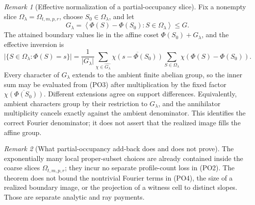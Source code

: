 \documentclass[12pt,a4paper]{amsart}
\numberwithin{equation}{section}
\theoremstyle{remark}
\newtheorem{remark}[remark]{Remark}
\newcommand{\abs}[1]{\lvert #1\rvert}
\begin{document}
\begin{remark}[Effective normalization of a partial-occupancy slice]
Fix a nonempty slice \(\Omega_\lambda=\Omega_{t,m,p,r}\), choose
\(S_0\in\Omega_\lambda\), and let
\[
 G_\lambda=
 \left\langle\Phi(S)-\Phi(S_0):S\in\Omega_\lambda\right\rangle
 \le G.
\]
The attained boundary values lie in the affine coset
\(\Phi(S_0)+G_\lambda\), and the effective inversion is
\[
 \abs{\{S\in\Omega_\lambda:\Phi(S)=s\}}
 =\frac1{\abs{G_\lambda}}
   \sum_{\chi\in\widehat{G_\lambda}}
   \overline{\chi(s-\Phi(S_0))}
   \sum_{S\in\Omega_\lambda}
      \chi(\Phi(S)-\Phi(S_0)).                       \tag{PO5}
\]
Every character of \(G_\lambda\) extends to the ambient finite abelian
group, so the inner sum may be evaluated from \textup{(PO3)} after
multiplication by the fixed factor
\(\overline{\chi(\Phi(S_0))}\).  Different extensions agree on support
differences.  Equivalently, ambient characters group by their restriction
to \(G_\lambda\), and the annihilator multiplicity cancels exactly against
the ambient denominator.  This identifies the correct Fourier denominator;
it does not assert that the realized image fills the affine group.
\end{remark}

\begin{remark}[What partial-occupancy add-back does and does not prove]
The exponentially many local proper-subset choices are already contained
inside the coarse slices \(\Omega_{t,m,p,r}\); they incur no separate
profile-count loss in \textup{(PO2)}.  The theorem does not bound the
nontrivial Fourier terms in \textup{(PO4)}, the size of a realized
boundary image, or the projection of a witness cell to distinct slopes.
Those are separate analytic and ray payments.
\end{remark}
\end{document}
